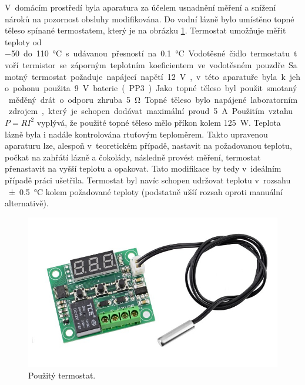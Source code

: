 \documentclass[12pt]{article}
\begin{document}
\par\noindent
V~domácím prostředí byla aparatura za účelem usnadnění měření a snížení nároků na pozornost obsluhy modifikována. Do vodní lázně bylo umístěno topné těleso spínané termostatem, který je na obrázku \ref{fig:termostat}. Termostat umožňuje měřit teploty od \SI{-50} do \SI{110}{\degreeCelsius} s udávanou přesností na \SI{0,1}{\degreeCelsius}. Vodotěsné čidlo termostatu tvoří termistor se záporným teplotním koeficientem ve vodotěsném pouzdře. Samotný termostat požaduje napájecí napětí \SI{12}{\volt}, v~této aparatuře byla k jeho pohonu použita \SI{9}{\volt} baterie (PP3). Jako topné těleso byl použit smotaný měděný drát o odporu zhruba \SI{5}{\ohm}. Topné těleso bylo napájené laboratorním zdrojem, který je schopen dodávat maximální proud \SI{5}{\ampere}. Použitím vztahu $P=RI^2$ vyplývá, že použité topné těleso mělo příkon kolem \SI{125}{\watt}. Teplota lázně byla i nadále kontrolována rtuťovým teploměrem. Takto upravenou aparaturu lze, alespoň v~teoretickém případě, nastavit na požadovanou teplotu, počkat na zahřátí lázně a čokolády, následně provést měření, termostat přenastavit na vyšší teplotu a opakovat. Tato modifikace by tedy v~ideálním případě práci ušetřila. Termostat byl navíc schopen udržovat teplotu v~rozsahu \SI{\pm 0,5}{\degreeCelsius} kolem požadované teploty (podstatně užší rozsah oproti manuální alternativě).
\begin{figure}
    \centering
    \includegraphics[width = 0.5\linewidth]{figures/termostat.jpg}
    \caption{Použitý termostat.~\cite{Figure:termostat}}
    \label{fig:termostat}
\end{figure}
\end{document}
